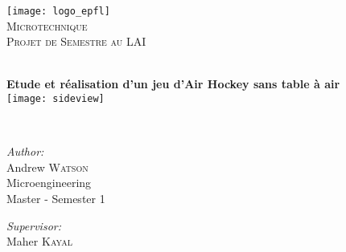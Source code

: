 

\newcommand{\thedate}{January 8, 2010}
\usepackage[pdftex]{graphicx} 
\usepackage{pdfpages}

\begin{titlepage}
\nocite{*}      %
  \begin{center}
     
     
    \texttt{[image: logo\_epfl]}\\[1.5cm]
     
    \textsc{\LARGE Microtechnique }\\[1.0cm]

    \textsc{\Large Projet de Semestre au LAI}\\[0.1cm]

    \vfill 
     
    \HRule \\[0.7cm]
    { \huge \bfseries Etude et réalisation d'un jeu d'Air Hockey sans table à
    air}\\[0.4cm]

    \texttt{[image: sideview]} 
     
    \HRule \\[2.0cm]
    
    \begin{minipage}{0.4\textwidth}
      \begin{flushleft} \large
        \emph{Author:} \\
        Andrew \textsc{Watson}\\[1.0cm]

        Microengineering\\
        Master - Semester 1\\[0.5cm]
      \end{flushleft}
    \end{minipage}
    \begin{minipage}{0.4\textwidth}
      \begin{flushright} \large
        \emph{Supervisor:} \\
        Maher \textsc{Kayal}\\[0.5cm]


\end{flushright}
\end{minipage}
\end{center}
\end{titlepage}
